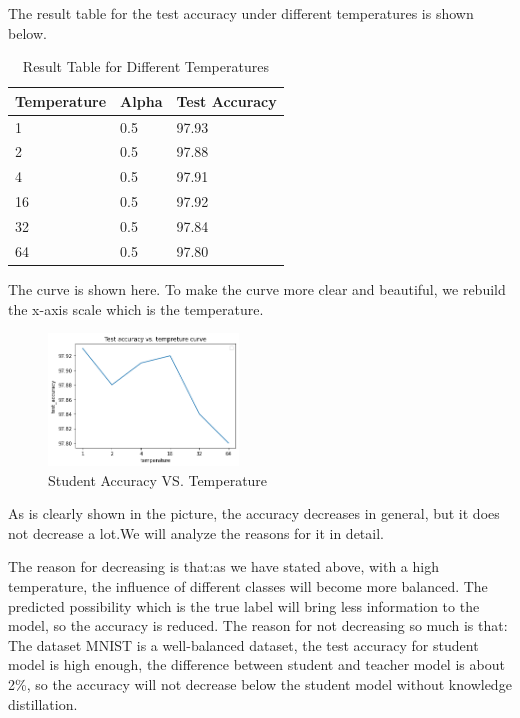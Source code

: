 \documentclass[conference]{IEEEtran}
\begin{document}
The result table for the test accuracy under different temperatures is shown below.
\begin{table}[]
    \begin{tabular}{|l|l|l|}
    \hline
    Temperature & Alpha & Test Accuracy      \\ \hline
    1           & 0.5   & 97.93   \\ \hline
    2           & 0.5   & 97.88 \\ \hline
    4           & 0.5   & 97.91 \\ \hline
    16          & 0.5   & 97.92  \\ \hline
    32          & 0.5   & 97.84 \\ \hline
    64          & 0.5   & 97.80 \\ \hline
    \end{tabular}
    \caption{Result Table for Different Temperatures}
\end{table}\par
The curve is shown here. To make the curve more clear and beautiful, we rebuild the x-axis scale which is the temperature.
\begin{figure}[h] 
    \centering
    \includegraphics[width=0.45\textwidth]{./graphs/accuracy_vs_temperature.png}
    \caption{Student Accuracy VS. Temperature}
    \label{Fig.t1q3e}
\end{figure}
As is clearly shown in the picture, the accuracy decreases in general, but it does not decrease a lot.We will analyze the reasons for it in detail.\par
The reason for decreasing is that:as we have stated above, with a high temperature, the influence of different classes will become more balanced. The predicted possibility which is the true label will bring less information to the model, so the accuracy is reduced.
The reason for not decreasing so much is that: The dataset MNIST is a well-balanced dataset, the test accuracy for student model is high enough, the difference between student and teacher model is about 2\%, so the accuracy will not decrease below the student model without knowledge distillation.
\end{document}
